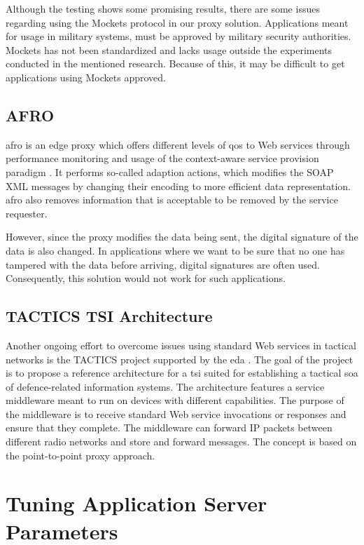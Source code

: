 Although the testing shows some promising results, there are some issues
regarding using the Mockets protocol in our proxy solution. Applications meant
for usage in military systems, must be approved by military security
authorities. Mockets has not been standardized and lacks usage outside the
experiments conducted in the mentioned research. Because of this, it may be
difficult to get applications using Mockets approved.

\subsection{AFRO}

\gls{afro} is an edge proxy which offers different levels of \gls{qos} to Web
services through performance monitoring and usage of the context-aware service
provision paradigm \cite{ist-090}. It performs so-called adaption actions, which
modifies the SOAP XML messages by changing their encoding to more efficient data
representation. \gls{afro} also removes information that is acceptable to be
removed by the service requester.

However, since the proxy modifies the data being sent, the digital signature of
the data is also changed. In applications where we want to be sure that no one
has tampered with the data before arriving, digital signatures are often used.
Consequently, this solution would not work for such applications.


\subsection{TACTICS TSI Architecture}

Another ongoing effort to overcome issues using standard Web services in
tactical networks is the TACTICS project supported by the \gls{eda}
\cite{tactics-diefenbach}. The goal of the project is to propose a reference
architecture for a \gls{tsi} suited for establishing a tactical \gls{soa} of
defence-related information systems. The architecture features a service
middleware meant to run on devices with different capabilities. The purpose of
the middleware is to receive standard Web service invocations or responses and
ensure that they complete. The middleware can forward IP packets between
different radio networks and store and forward messages. The concept is based on
the point-to-point proxy approach.


\section{Tuning Application Server Parameters}

